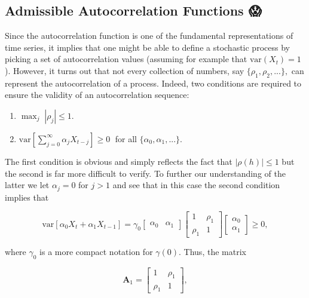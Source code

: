 \documentclass[]{book}
\providecommand{\tightlist}{%
  \setlength{\itemsep}{0pt}\setlength{\parskip}{0pt}}
\theoremstyle{definition}
\theoremstyle{definition}
\theoremstyle{definition}
\theoremstyle{remark}
\begin{document}
\subsection{Admissible Autocorrelation Functions
😱}\label{admissible-autocorrelation-functions}

Since the autocorrelation function is one of the fundamental
representations of time series, it implies that one might be able to
define a stochastic process by picking a set of autocorrelation values
(assuming for example that \(\text{var}(X_t) = 1\)). However, it turns
out that not every collection of numbers, say
\(\{\rho_1, \rho_2, ...\},\) can represent the autocorrelation of a
process. Indeed, two conditions are required to ensure the validity of
an autocorrelation sequence:

\begin{enumerate}
\def\labelenumi{\arabic{enumi}.}
\tightlist
\item
  \(\operatorname{max}_j \; \left| \rho_j \right| \leq 1\).
\item
  \(\text{var} \left[\sum_{j = 0}^\infty \alpha_j X_{t-j} \right] \geq 0 \;\)
  for all \(\{\alpha_0, \alpha_1, ...\}\).
\end{enumerate}

The first condition is obvious and simply reflects the fact that
\(|\rho \left( h \right)| \leq 1\) but the second is far more difficult
to verify. To further our understanding of the latter we let
\(\alpha_j = 0\) for \(j > 1\) and see that in this case the second
condition implies that

\[\text{var} \left[ \alpha_0 X_{t} + \alpha_1 X_{t-1}  \right] = \gamma_0 \begin{bmatrix}
   \alpha_0 & \alpha_1
   \end{bmatrix}   \begin{bmatrix}
   1 & \rho_1\\
   \rho_1 & 1
   \end{bmatrix} \begin{bmatrix}
   \alpha_0 \\
   \alpha_1
   \end{bmatrix} \geq 0, \]

where \(\gamma_0\) is a more compact notation for \(\gamma(0)\). Thus,
the matrix

\[ \boldsymbol{A}_1 = \begin{bmatrix}
  1 & \rho_1\\
  \rho_1 & 1
  \end{bmatrix}, \]
\end{document}

